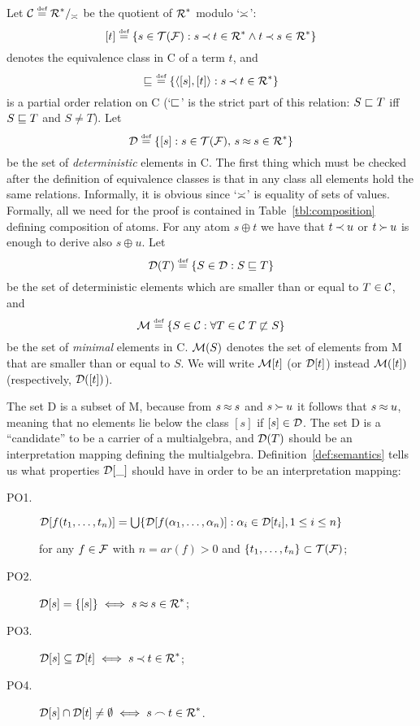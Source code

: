 Let \(\C C\Def \C R^\ast/_{\Seteq}\) be the quotient of \(\C R^\ast\) modulo
`$\Seteq$':
\[[t]\Def \{s\in\Terms\Funcs: s\Incl t\in\C R^\ast\land t\Incl s\in\C R^\ast\}\]
denotes the equivalence class in \C C of a term $t$, and  
\[\Eineq\ \Def\{\<[s],[t]\>: s\Incl t\in\C R^\ast \}\]
is a partial order relation on \C C (`$\Ein$' is the strict part of this
relation: \(S\Ein T\) iff \(S\Eineq T\) and \(S\ne T\)). Let
\[\C D\Def \{[s]:s\in\Terms\Funcs,\, s\Eq s\in\C R^\ast\}\]
be the set of {\em deterministic} elements in \C C. The first thing which must
be checked after the definition of equivalence classes is that in any class all
elements hold the same relations. Informally, it is obvious since `$\Seteq$'
is equality of sets of values. Formally, all we need for the proof is contained in
Table~\ref {tbl:composition} defining composition of atoms. For any atom
\(s\oplus t\) we have that \(t\Incl u\) or \(t\Cont u\) is enough to derive
also \(s\oplus u\). Let
\[\C D(T)\Def \{S\in\C D:S\Eineq T\}\] 
be the set of deterministic elements which are smaller than or equal to $T\in\C
C$, and 
\[\C M\Def \{S\in\C C:\forall T\in\C C\;T\not\Ein S\}\]
be the set of {\em minimal} elements in \C C. \(\C M(S)\) denotes the set of
elements from \C M that are smaller than or equal to $S$. We will write \(\C
M[t]\) (or \(\C D[t]\)) instead \(\C M([t])\) (respectively, \(\C D([t])\)). 

The set \C D is a subset of \C M, because from \(s\Eq s\) and \(s\Cont u\)
it follows that \(s\Eq u\), meaning that no elements lie below the class \([s]\) if
\([s]\in\C D\). The set \C D is a ``candidate'' to be a carrier of a
multialgebra, and \(\C D(T)\) should be an interpretation mapping defining the
multialgebra.  Definition~\ref {def:semantics} tells us what properties
$\C D[\_]$ should have in order to be an interpretation mapping:
\begin{description}
\item [PO1.] \(\C D [f(\List tn,)] =
\bigcup\{\C D [f(\List\alpha n,)]:\alpha_i\in \C D [t_i],1\leq i\leq n\}\) 

for any \(f\in \Funcs\) with \(n=ar(f)>0\) and \(\{\List tn,\}\subset
\Terms\Funcs\);
\item [PO2.] \(\C D [s]=\{[s]\}\iff s\Eq s\in\C R^\ast\);
\item [PO3.] \(\C D [s]\subseteq \C D [t] \iff s\Incl t\in\C R^\ast\);
\item [PO4.] \(\C D [s]\cap \C D [t]\ne\es \iff s\Int t\in\C R^\ast\).
\end{description}

